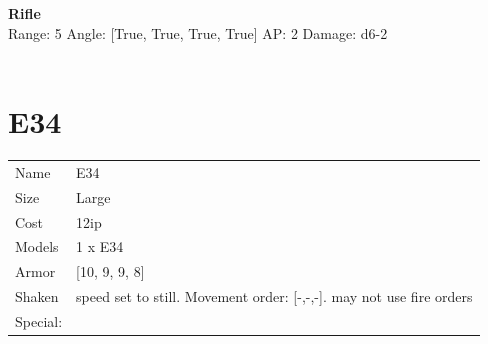 \ \\

\ \\
{\bf Rifle } \\



Range: 5  Angle: [True, True, True, True] AP: 2 Damage: d6-2 \\




 
\ \\













\clearpage

\section{ E34 }

\begin{tabular}{ll}
  Name & E34 \\
  Size & Large\\
  Cost & 12ip\\
  Models & 1 x E34\\
  Armor & [10, 9, 9, 8]\\
  Shaken & speed set to still. Movement order: [-,-,-]. may not use fire orders\\
  Special: \\
\end{tabular}

\noindent 

